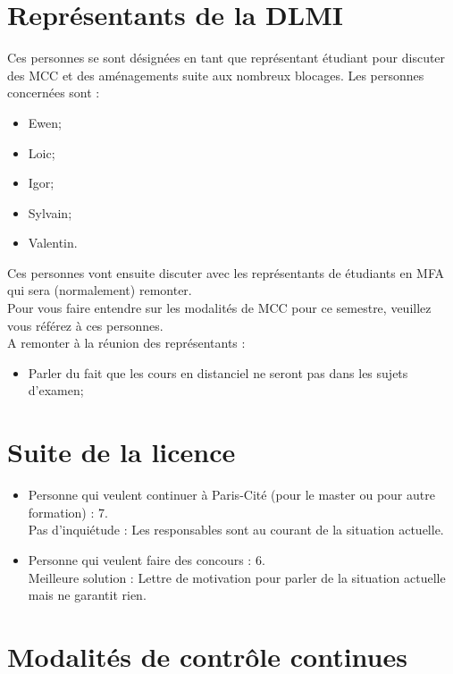 \documentclass{article}
\begin{document}

\section{Représentants de la DLMI}

Ces personnes se sont désignées en tant que représentant étudiant pour discuter des MCC et des aménagements suite aux nombreux blocages. Les personnes concernées sont : 
\begin{itemize}
    \item Ewen;
    \item Loic;
    \item Igor;
    \item Sylvain;
    \item Valentin.
\end{itemize}
Ces personnes vont ensuite discuter avec les représentants de étudiants en MFA qui sera (normalement) remonter.\\
Pour vous faire entendre sur les modalités de MCC pour ce semestre, veuillez vous référez à ces personnes.\\
A remonter à la réunion des représentants :
\begin{itemize}
    \item Parler du fait que les cours en distanciel ne seront pas dans les sujets d'examen;
\end{itemize}


\section{Suite de la licence}

\begin{itemize}
    \item Personne qui veulent continuer à Paris-Cité (pour le master ou pour autre formation) : 7.\\
    Pas d'inquiétude : Les responsables sont au courant de la situation actuelle.
    \item Personne qui veulent faire des concours : 6.\\
    Meilleure solution : Lettre de motivation pour parler de la situation actuelle mais ne garantit rien.
\end{itemize}

\section{Modalités de contrôle continues}
\end{document}
